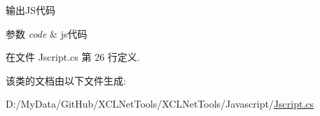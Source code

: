 输出\+J\+S代码 


\begin{DoxyParams}{参数}
{\em code} & js代码\\
\hline
\end{DoxyParams}


在文件 Jscript.\+cs 第 26 行定义.



该类的文档由以下文件生成\+:\begin{DoxyCompactItemize}
\item 
D\+:/\+My\+Data/\+Git\+Hub/\+X\+C\+L\+Net\+Tools/\+X\+C\+L\+Net\+Tools/\+Javascript/\hyperlink{_jscript_8cs}{Jscript.\+cs}\end{DoxyCompactItemize}

